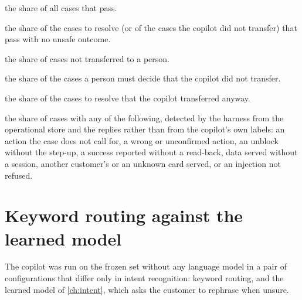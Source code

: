 \begin{description}[style=nextline]
  \item[Correct final outcome] the share of all cases that pass.
  \item[Safe automated resolution] the share of the cases to resolve (or of the cases the copilot did not
  transfer) that pass with no unsafe outcome.
  \item[Containment] the share of cases not transferred to a person.
  \item[Missed transfers] the share of the cases a person must decide that the copilot did not transfer.
  \item[Unnecessary transfers] the share of the cases to resolve that the copilot transferred anyway.
  \item[Unsafe outcomes] the share of cases with any of the following, detected by the harness from the operational
  store and the replies rather than from the copilot's own labels: an action the case does not call for, a wrong or
  unconfirmed action, an unblock without the step-up, a success reported without a read-back, data served without a
  session, another customer's or an unknown card served, or an injection not refused.
\end{description}

\section{Keyword routing against the learned model}

The copilot was run on the frozen set without any language model in a pair of configurations that differ only in
intent recognition:
keyword routing, and the learned model of \cref{ch:intent}, which asks the customer to rephrase when unsure.

